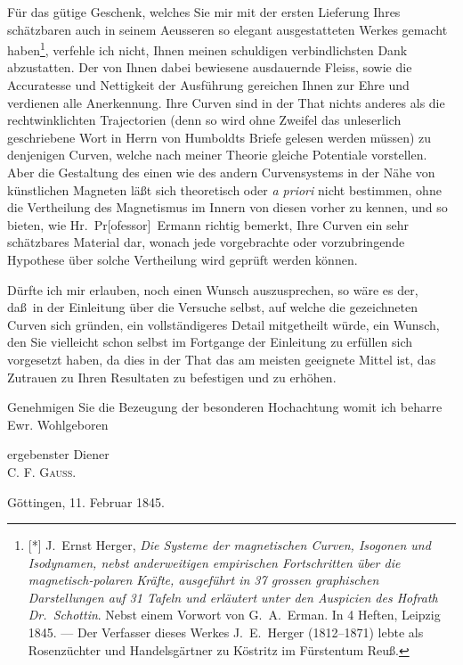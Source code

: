 \documentclass[12pt,a4paper]{article}
\theoremstyle{plain}
\theoremstyle{definition}
\theoremstyle{remark}
\begin{document}
F\"ur das g\"utige Geschenk, welches Sie mir mit der ersten Lieferung
Ihres sch\"atzbaren auch in seinem Aeusseren so elegant
ausgestatteten Werkes gemacht haben\footnote{[*] J.~{\sc Ernst Herger},
{\it Die Systeme der magnetischen Curven, Isogonen und Isodynamen,
nebst anderweitigen empirischen Fortschritten \"uber die
magnetisch-polaren Kr\"afte, ausgef\"uhrt in 37 grossen graphischen
Darstellungen auf 31 Tafeln und erl\"autert unter den Auspicien des
Hofrath Dr.~Schottin}. Nebst einem Vorwort von G.~A.~{\sc Erman}.
In 4 Heften, Leipzig 1845. --- Der Verfasser dieses Werkes
J.~E.~{\sc Herger} (1812--1871) lebte als Rosenz\"uchter und
Handelsg\"artner zu K\"ostritz im F\"urstentum Reu\ss.},
verfehle ich nicht, Ihnen meinen schuldigen verbindlichsten Dank
abzustatten. Der von Ihnen dabei bewiesene ausdauernde Fleiss, sowie
die Accuratesse und Nettigkeit der Ausf\"uhrung gereichen Ihnen zur
Ehre und verdienen alle Anerkennung. Ihre Curven sind in der That
nichts anderes als die rechtwinklichten Trajectorien (denn so wird
ohne Zweifel das unleserlich geschriebene Wort in Herrn von
{\sc Humboldts} Briefe gelesen werden m\"ussen) zu denjenigen Curven,
welche nach meiner Theorie gleiche Potentiale vorstellen. Aber die
Gestaltung des einen wie des andern Curvensystems in der N\"ahe von
k\"unstlichen Magneten l\"a\ss t sich theoretisch oder {\it a priori}
nicht bestimmen, ohne die Vertheilung des Magnetismus im Innern von
diesen vorher zu kennen, und so bieten, wie Hr.~Pr[ofessor]~{\sc Ermann}
richtig bemerkt, Ihre Curven ein sehr sch\"atzbares Material dar,
wonach jede vorgebrachte oder vorzubringende Hypothese \"uber solche
Vertheilung wird gepr\"uft werden k\"onnen.

D\"urfte ich mir erlauben, noch einen Wunsch auszusprechen, so w\"are
es der, da\ss\ in der Einleitung \"uber die Versuche selbst, auf welche
die gezeichneten Curven sich gr\"unden, ein vollst\"andigeres Detail
mitgetheilt w\"urde, ein Wunsch, den Sie vielleicht schon selbst im
Fortgange der Einleitung zu erf\"ullen sich vorgesetzt haben, da dies
in der That das am meisten geeignete Mittel ist, das Zutrauen zu
Ihren Resultaten zu befestigen und zu erh\"ohen.

Genehmigen Sie die Bezeugung der besonderen Hochachtung womit ich
beharre Ewr. Wohlgeboren

\begin{flushright}
ergebenster Diener\\
\textsc{C. F. Gau\ss.}
\end{flushright}
\begin{center}
G\"ottingen, 11. Februar 1845.
\end{center}
\end{document}
